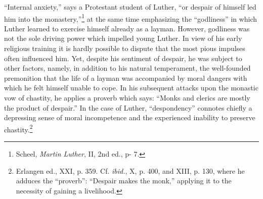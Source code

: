 “Internal anxiety,” says a Protestant student of Luther, “or despair
of himself led him into the monastery,”\footnote{Scheel, \textit{Martin Luther}, II, 2nd ed., p- 7.}
at the same time emphasizing the “godliness” in which Luther learned to exercise himself
already as a layman. However, godliness was not the sole driving
power which impelled young Luther. In view of his early religious
training it is hardly possible to dispute that the most pious impulses
often influenced him. Yet, despite his sentiment of despair, he was
subject to other factors, namely, in addition to his natural temperament,
the well-founded premonition that the life of a layman was
accompanied by moral dangers with which he felt himself unable
to cope. In his subsequent attacks upon the monastic vow of chastity,
he applies a proverb which says: “Monks and clerics are mostly the
product of despair.” In the case of Luther, “despondency” connotes
chiefly a depressing sense of moral incompetence and the experienced inability to preserve chastity.\footnote
{Erlangen ed., XXI, p. 359. Cf. \textit{ibid.}, X, p. 400, and XIII, p. 130, where he adduces
the “proverb”: “Despair makes the monk,” applying it to the necessity of gaining a livelihood.}

